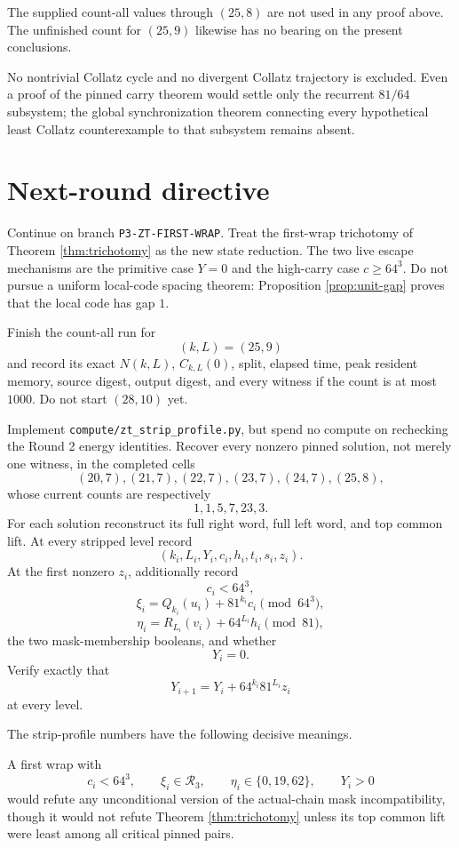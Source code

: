 \documentclass[11pt]{article}
\theoremstyle{remark}
\newcommand{\Rset}{\mathcal{R}}
\begin{document}
The supplied count-all values through \((25,8)\) are not used in any proof above.  The unfinished count for \((25,9)\) likewise has no bearing on the present conclusions.

No nontrivial Collatz cycle and no divergent Collatz trajectory is excluded.  Even a proof of the pinned carry theorem would settle only the recurrent \(81/64\) subsystem; the global synchronization theorem connecting every hypothetical least Collatz counterexample to that subsystem remains absent.

\section{Next-round directive}

Continue on branch \texttt{P3-ZT-FIRST-WRAP}.  Treat the first-wrap trichotomy of Theorem \ref{thm:trichotomy} as the new state reduction.  The two live escape mechanisms are the primitive case \(Y=0\) and the high-carry case \(c\ge64^3\).  Do not pursue a uniform local-code spacing theorem: Proposition \ref{prop:unit-gap} proves that the local code has gap \(1\).

Finish the count-all run for
\[
(k,L)=(25,9)
\]
and record its exact \(N(k,L)\), \(C_{k,L}(0)\), split, elapsed time, peak resident memory, source digest, output digest, and every witness if the count is at most \(1000\).  Do not start \((28,10)\) yet.

Implement \texttt{compute/zt\_strip\_profile.py}, but spend no compute on rechecking the Round 2 energy identities.  Recover every nonzero pinned solution, not merely one witness, in the completed cells
\[
(20,7),(21,7),(22,7),(23,7),(24,7),(25,8),
\]
whose current counts are respectively
\[
1,1,5,7,23,3.
\]
For each solution reconstruct its full right word, full left word, and top common lift.  At every stripped level record
\[
(k_i,L_i,Y_i,c_i,h_i,t_i,s_i,z_i).
\]
At the first nonzero \(z_i\), additionally record
\[
c_i<64^3,
\]
\[
\xi_i=
Q_{k_i}(u_i)+81^{k_i}c_i\pmod{64^3},
\]
\[
\eta_i=
R_{L_i}(v_i)+64^{L_i}h_i\pmod{81},
\]
the two mask-membership booleans, and whether
\[
Y_i=0.
\]
Verify exactly that
\[
Y_{i+1}=Y_i+64^{k_i}81^{L_i}z_i
\]
at every level.

The strip-profile numbers have the following decisive meanings.

A first wrap with
\[
c_i<64^3,\qquad
\xi_i\in\Rset_3,\qquad
\eta_i\in\{0,19,62\},\qquad
Y_i>0
\]
would refute any unconditional version of the actual-chain mask incompatibility, though it would not refute Theorem \ref{thm:trichotomy} unless its top common lift were least among all critical pinned pairs.
\end{document}
